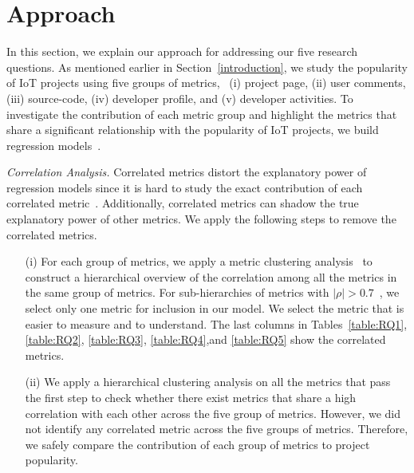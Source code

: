 \section{Approach}\label{section:approach}

In this section, we explain our approach for addressing our five research questions.
As mentioned earlier in Section~\ref{introduction}, we study the popularity of IoT projects using five groups of metrics, \ie~(i) project page, (ii) user comments, (iii) source-code, (iv) developer profile, and (v) developer activities.
To investigate the contribution of each metric group and highlight the metrics that share a significant relationship with the popularity of IoT projects, we build regression
models~\cite{weisberg2005applied,lrm}.

\vspace{0.1cm}

\noindent\textit{Correlation Analysis.}
Correlated metrics distort the explanatory power of regression models since it is hard to study the exact contribution of each correlated metric~\cite{harrell2001rms}.
Additionally, correlated metrics can shadow the true explanatory power of other metrics.
We apply the following steps to remove the correlated metrics.

\begin{enumerate}
	\item[(i)] For each group of metrics, we apply a metric clustering analysis~\cite{sarle1990varclus} to construct a hierarchical overview of the correlation among all the metrics in the same group of metrics.
	For sub-hierarchies of metrics with $|\rho|>0.7$~\cite{nguyen2010studying}, we select only one metric for inclusion in our model. We select the metric that is easier to measure and to understand. The last columns in Tables~\ref{table:RQ1}, \ref{table:RQ2}, \ref{table:RQ3}, \ref{table:RQ4},and \ref{table:RQ5} show the correlated metrics.
	
	\item[(ii)] We apply a hierarchical clustering analysis on all the metrics that pass the first step to check whether there exist metrics that share a high correlation with each other across the five group of metrics. However, we did not identify any correlated metric across the five groups of metrics. Therefore, we safely compare the contribution of each group of metrics to project popularity.
\end{enumerate}

\vspace{0.1cm}

